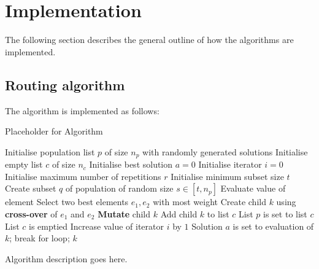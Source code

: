 \section{Implementation} \label{section: Implementation}

The following section describes the general outline of how the algorithms are implemented.

\subsection{Routing algorithm}
The algorithm is implemented as follows:

\begin{algorithm}
    \caption{Placeholder for Algorithm}\label{alg:gen}
    \begin{algorithmic}
        \State Initialise population list $p$ of size $n_p$ with randomly generated solutions
        \State Initialise empty list $c$ of size $n_c$
        \State Initialise best solution $a = 0$
        \State Initialise iterator $i = 0$
        \State Initialise maximum number of repetitions $r$
        \State Initialise minimum subset size $t$
        \State Create subset $q$ of population of random size $s\in [t, n_p]$
        \State Evaluate value of element
        \EndFor
        \State Select two best elements ${e_1, e_2}$ with most weight
        \State Create child $k$ using \textbf{cross-over} of ${e_1}$ and ${e_2}$
        \State \textbf{Mutate} child $k$ 
        \State Add child $k$ to list $c$
        \State List $p$ is set to list $c$
        \State List $c$ is emptied
        \State Increase value of iterator $i$ by $1$
        \State Solution $a$ is set to evaluation of $k$;
        \EndIf
         
        \State break for loop;
        \EndIf
        \EndIf
        \EndFor
        \Ensure $k$
    \end{algorithmic}
\end{algorithm}


Algorithm description goes here.

